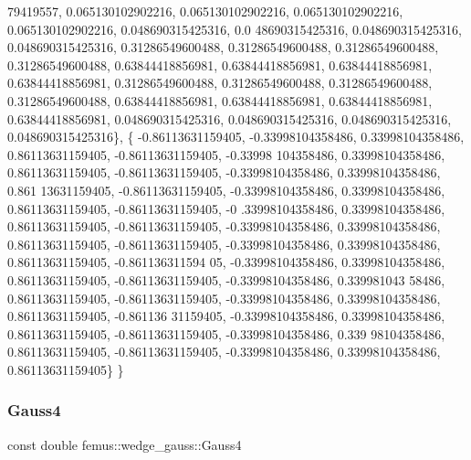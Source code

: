 \begin{DoxyCode}
      79419557, 0.065130102902216, 0.065130102902216, 0.065130102902216, 0.065130102902216, 0.048690315425316, 0.0
      48690315425316, 0.048690315425316, 0.048690315425316, 0.31286549600488, 0.31286549600488, 0.31286549600488, 
      0.31286549600488, 0.63844418856981, 0.63844418856981, 0.63844418856981, 0.63844418856981, 0.31286549600488, 
      0.31286549600488, 0.31286549600488, 0.31286549600488, 0.63844418856981, 0.63844418856981, 0.63844418856981, 
      0.63844418856981, 0.048690315425316, 0.048690315425316, 0.048690315425316, 0.048690315425316\},
    \{ -0.86113631159405, -0.33998104358486, 0.33998104358486, 0.86113631159405, -0.86113631159405, -0.33998
      104358486, 0.33998104358486, 0.86113631159405, -0.86113631159405, -0.33998104358486, 0.33998104358486, 0.861
      13631159405, -0.86113631159405, -0.33998104358486, 0.33998104358486, 0.86113631159405, -0.86113631159405, -0
      .33998104358486, 0.33998104358486, 0.86113631159405, -0.86113631159405, -0.33998104358486, 0.33998104358486,
       0.86113631159405, -0.86113631159405, -0.33998104358486, 0.33998104358486, 0.86113631159405, -0.861136311594
      05, -0.33998104358486, 0.33998104358486, 0.86113631159405, -0.86113631159405, -0.33998104358486, 0.339981043
      58486, 0.86113631159405, -0.86113631159405, -0.33998104358486, 0.33998104358486, 0.86113631159405, -0.861136
      31159405, -0.33998104358486, 0.33998104358486, 0.86113631159405, -0.86113631159405, -0.33998104358486, 0.339
      98104358486, 0.86113631159405, -0.86113631159405, -0.33998104358486, 0.33998104358486, 0.86113631159405\}
  \}
\end{DoxyCode}
\mbox{\label{classfemus_1_1wedge__gauss_a3d933a8ba8b6d4f1a629787a468eddf8}} 
\subsubsection{\texorpdfstring{Gauss4}{Gauss4}}
{\footnotesize\ttfamily const double femus\+::wedge\+\_\+gauss\+::\+Gauss4\hspace{0.3cm}{\ttfamily [static]}}

